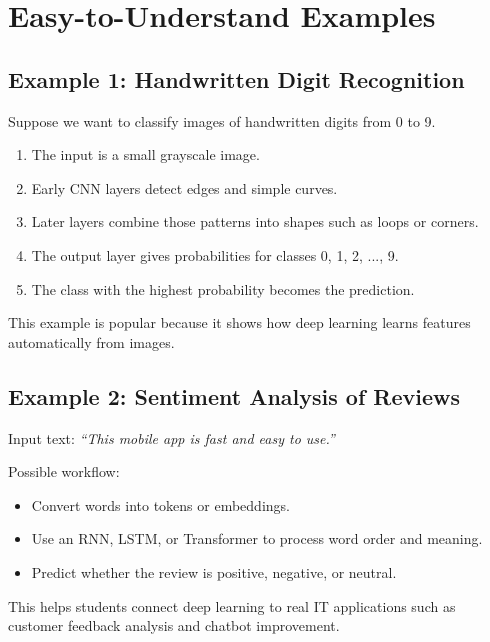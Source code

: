 \documentclass[11pt,a4paper]{article}
\begin{document}
\section{Easy-to-Understand Examples}

\subsection{Example 1: Handwritten Digit Recognition}

\begin{examplebox}
Suppose we want to classify images of handwritten digits from 0 to 9.
\begin{enumerate}[leftmargin=*]
  \item The input is a small grayscale image.
  \item Early CNN layers detect edges and simple curves.
  \item Later layers combine those patterns into shapes such as loops or corners.
  \item The output layer gives probabilities for classes 0, 1, 2, ..., 9.
  \item The class with the highest probability becomes the prediction.
\end{enumerate}
This example is popular because it shows how deep learning learns features automatically from images.
\end{examplebox}

\subsection{Example 2: Sentiment Analysis of Reviews}

\begin{examplebox}
Input text: \textit{``This mobile app is fast and easy to use.''}

Possible workflow:
\begin{itemize}[leftmargin=*]
  \item Convert words into tokens or embeddings.
  \item Use an RNN, LSTM, or Transformer to process word order and meaning.
  \item Predict whether the review is positive, negative, or neutral.
\end{itemize}
This helps students connect deep learning to real IT applications such as customer feedback analysis and chatbot improvement.
\end{examplebox}
\end{document}

